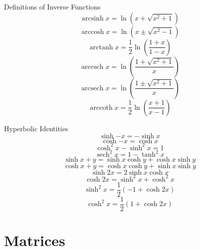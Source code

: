 \documentclass[12pt]{article}
\numberwithin{equation}{subsection}
\newcommand{\lnp}[1]{\ln\left( #1 \right)}
\DeclareMathOperator{\sech}{sech}
\DeclareMathOperator{\arcsinh}{arcsinh}
\DeclareMathOperator{\arccosh}{arccosh}
\DeclareMathOperator{\arctanh}{arctanh}
\DeclareMathOperator{\arccsch}{arccsch}
\DeclareMathOperator{\arcsech}{arcsech}
\DeclareMathOperator{\arccoth}{arccoth}
\begin{document}
Definitions of Inverse Functions
\begin{equation}
\arcsinh{x}=\lnp{x+ \sqrt{x^{2}+1}}
\end{equation}
\begin{equation}
\arccosh{x}=\lnp{x \pm \sqrt{x^{2}-1}}
\end{equation}
\begin{equation}
\arctanh{x}= \frac{1}{2} \lnp{\frac{1+x}{1-x}}
\end{equation}
\begin{equation}
\arccsch{x}=\lnp{\frac{1+\sqrt{x^{2}+1}}{x}}
\end{equation}
\begin{equation}
\arcsech{x}=\lnp{\frac{1 \pm \sqrt{x^{2}+1}}{x}}
\end{equation}
\begin{equation}
\arccoth{x}= \frac{1}{2} \lnp{\frac{x+1}{x-1}}
\end{equation}

Hyperbolic Identities
\begin{equation}
\sinh{-x}=-\sinh{x}
\end{equation}
\begin{equation}
\cosh{-x}=\cosh{x}
\end{equation}
\begin{equation}
\cosh^2{x}-\sinh^2{x}=1
\end{equation}
\begin{equation}
\sech^2{x}=1-\tanh^2{x}
\end{equation}
\begin{equation}
\sinh{x+y}=\sinh{x}\cosh{y} + \cosh{x}\sinh{y}
\end{equation}
\begin{equation}
\cosh{x+y}=\cosh{x}\cosh{y} + \sinh{x}\sinh{y}
\end{equation}
\begin{equation}
\sinh{2x}=2\sinh{x}\cosh{x}
\end{equation}
\begin{equation}
\cosh{2x}=\sinh^2{x}+\cosh^2{x}
\end{equation}
\begin{equation}
\sinh^2{x}=\frac{1}{2}(-1+\cosh{2x})
\end{equation}
\begin{equation}
\cosh^2{x}=\frac{1}{2}(1+\cosh{2x})
\end{equation}

\newpage



\section{Matrices}
\end{document}
